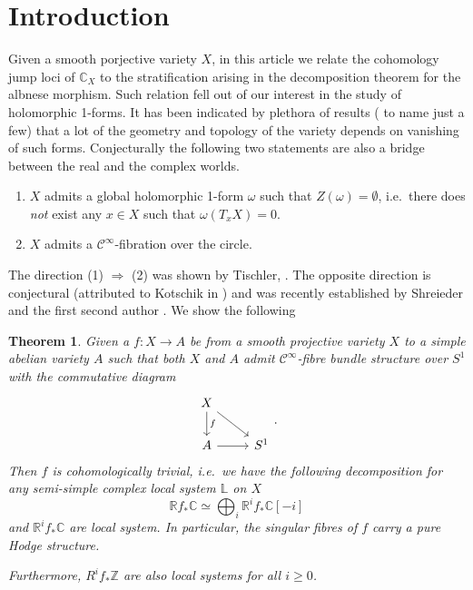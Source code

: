 \documentclass[12pt,reqno]{amsart}
\newtheorem{alphtheorem}{Theorem}
\theoremstyle{question}
\theoremstyle{definition}
\theoremstyle{remark}
\theoremstyle{cited}
\theoremstyle{citeddef}
\newcommand{\bbC}{\mathbb{C}}
\newcommand{\bbL}{\mathbb{L}}
\newcommand{\bbR}{\mathbb{R}}
\newcommand{\bbZ}{\mathbb{Z}}
\newcommand{\scrC}{\mathscr{C}}
\begin{document}
\section{Introduction}\label{intro}
Given a smooth porjective variety $X$, in this article we relate the cohomology jump loci of $\bbC_X$ to the 
stratification arising in the decomposition theorem for the albnese morphism. Such relation fell out of our interest in the
study of holomorphic 1-forms. It has been indicated by plethora of results
(\cite{GL87, HK05, LZ05,
Sch19, HS19, PS14} to name just a few) that a lot of the geometry and topology of the
variety depends on vanishing of such forms. Conjecturally the following two statements
are also a bridge between the real and the complex worlds.
\begin{enumerate}
	\item $X$ admits a global holomorphic 1-form $\omega$
	such that $Z(\omega) = \emptyset$, i.e.\ there does \textsl{not}
	exist any $x\in X$ such that $\omega(T_xX) = 0$. 
	\item $X$ admits a $\scrC^{\infty}$-fibration over the circle.
\end{enumerate}
The direction (1) $\Rightarrow$ (2) was shown by Tischler,
\cite{Tis70}. The opposite direction is conjectural (attributed
to Kotschik in \cite{Sch19}) and
was recently established by Shreieder and the first second author
\cite{HS19}. We show the following 



\begin{alphtheorem}\label{thm:smooth}
Given a $f\colon X\to A$ be from a smooth projective variety $X$ to a simple abelian variety $A$ such that
both $X$ and $A$ admit $\scrC^{\infty}$-fibre bundle structure over $S^1$ with the commutative diagram
\[\begin{tikzcd}
	X\ar[dr]\ar[d, "f"]& \\
	A\ar[r]&S^1
\end{tikzcd}.\] 
Then $f$ is cohomologically trivial, i.e.\ we have the following
decomposition for any semi-simple complex local system $\bbL$ on $X$
\[\bbR f_*\bbC \simeq \bigoplus_i \bbR^i f_*\bbC[-i]\]
and $\bbR^i f_*\bbC$ are local system. In particular, the
singular fibres of $f$ carry a pure Hodge structure.

Furthermore, 
$R^if_*\bbZ$ are also local systems for 
all $i\geq 0$.

\end{alphtheorem}
\end{document}
